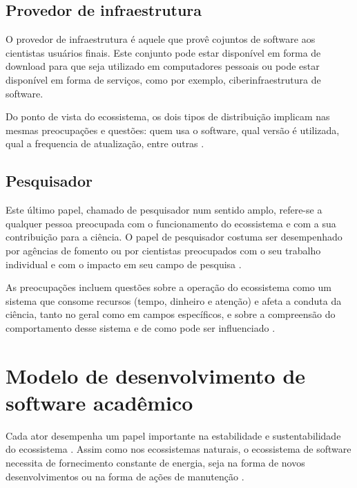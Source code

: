 \subsection{Provedor de infraestrutura}

O provedor de infraestrutura é aquele que provê cojuntos de software aos
cientistas usuários finais. Este conjunto pode estar disponível em forma de
download para que seja utilizado em computadores pessoais ou pode estar
disponível em forma de serviços, como por exemplo, ciberinfraestrutura
\cite{council2007cyberinfrastructure, stewart2010cyberinfrastructure} de
software.

Do ponto de vista do ecossistema, os dois tipos de distribuição implicam nas
mesmas preocupações e questões: quem usa o software, qual versão é utilizada, 
qual a frequencia de atualização, entre outras \cite{howison2015understanding}.

\subsection{Pesquisador}

Este último papel, chamado de pesquisador num sentido amplo, refere-se a
qualquer pessoa preocupada com o funcionamento do ecossistema e com a sua
contribuição para a ciência. O papel de pesquisador costuma ser desempenhado
por agências de fomento ou por cientistas preocupados com o seu trabalho
individual e com o impacto em seu campo de pesquisa
\cite{howison2015understanding}.

As preocupações incluem questões sobre a operação do ecossistema
como um sistema que consome recursos (tempo, dinheiro e atenção) e afeta a
conduta da ciência, tanto no geral como em campos específicos, 
e sobre a compreensão do comportamento desse sistema e de 
como pode ser influenciado \cite{howison2015understanding}.

\section{Modelo de desenvolvimento de software acadêmico}


Cada ator desempenha um papel importante na estabilidade e sustentabilidade do
ecossistema \cite{dhungana2010software}. Assim como nos ecossistemas naturais,
o ecossistema de software necessita de fornecimento constante de energia, seja
na forma de novos desenvolvimentos ou na forma de ações de manutenção
\cite{dhungana2010software}.

